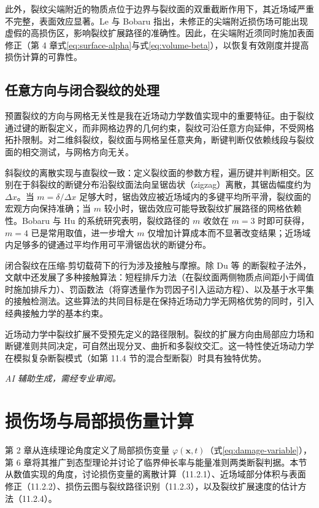 此外，裂纹尖端附近的物质点位于边界与裂纹面的双重截断作用下，其近场域严重不完整，表面效应显著。Le 与 Bobaru \cite{LeBobaru2018} 指出，未修正的尖端附近损伤场可能出现虚假的高损伤区，影响裂纹扩展路径的准确性。因此，在尖端附近须同时施加表面修正（第 4 章式\eqref{eq:surface-alpha}与式\eqref{eq:volume-beta}），以恢复有效刚度并提高损伤计算的可靠性。

\subsection{任意方向与闭合裂纹的处理}\label{sec:ch11-arbitrary-crack}

预置裂纹的方向与网格无关性是我在近场动力学数值实现中的重要特征。由于裂纹通过键的断裂定义，而非网格边界的几何约束，裂纹可沿任意方向延伸，不受网格拓扑限制。对二维斜裂纹，裂纹面与网格呈任意夹角，断键判断仅依赖线段与裂纹面的相交测试，与网格方向无关。

斜裂纹的离散实现与直裂纹一致：定义裂纹面的参数方程，遍历键并判断相交。区别在于斜裂纹的断键分布沿裂纹面法向呈锯齿状（zigzag）离散，其锯齿幅度约为 $\Delta x$。当 $m=\delta/\Delta x$ 足够大时，锯齿效应被近场域内的多键平均所平滑，裂纹面的宏观方向保持准确；当 $m$ 较小时，锯齿效应可能导致裂纹扩展路径的网格依赖性。Bobaru 与 Hu \cite{BobaruHu2012} 的系统研究表明，裂纹路径的 $m$ 收敛在 $m=3$ 时即可获得，$m=4$ 已是常用取值，进一步增大 $m$ 仅增加计算成本而不显著改变结果；近场域内足够多的键通过平均作用可平滑锯齿状的断键分布。

闭合裂纹在压缩-剪切载荷下的行为涉及接触与摩擦。除 Du 等 \cite{Du2020} 的断裂粒子法外，文献中还发展了多种接触算法：短程排斥力法（在裂纹面两侧物质点间距小于阈值时施加排斥力）、罚函数法（将穿透量作为罚因子引入运动方程）、以及基于水平集的接触检测法。这些算法的共同目标是在保持近场动力学无网格优势的同时，引入经典接触力学的基本约束。

近场动力学中裂纹扩展不受预先定义的路径限制。裂纹的扩展方向由局部应力场和断键准则共同决定，可自然出现分叉、曲折和多裂纹交汇。这一特性使近场动力学在模拟复杂断裂模式（如第 11.4 节的混合型断裂）时具有独特优势。

\emph{AI 辅助生成，需经专业审阅。}

\section{损伤场与局部损伤量计算}\label{sec:ch11-damage-field}

第 2 章从连续理论角度定义了局部损伤变量 $\varphi(\mathbf{x},t)$（式\eqref{eq:damage-variable}），第 6 章将其推广到态型理论并讨论了临界伸长率与能量准则两类断裂判据。本节从数值实现的角度，讨论损伤变量的离散计算（11.2.1）、近场域部分体积与表面修正（11.2.2）、损伤云图与裂纹路径识别（11.2.3），以及裂纹扩展速度的估计方法（11.2.4）。

